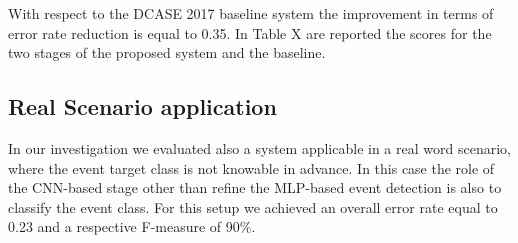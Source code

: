 \documentclass{article}
\begin{document}
\begin{sloppy}

With respect to the DCASE 2017 baseline system the improvement in terms of error rate reduction is equal to 0.35. In Table X are reported the scores for the two stages of the proposed system and the baseline.

\subsection{Real Scenario application}
In our investigation we evaluated also a system applicable in a real word scenario, where the event target class is not knowable in advance. In this case the role of the CNN-based stage other than refine the MLP-based event detection is also to classify the event class. For this setup we achieved an overall error rate equal to 0.23 and a respective F-measure of 90\%.


\end{sloppy}
\end{document}
